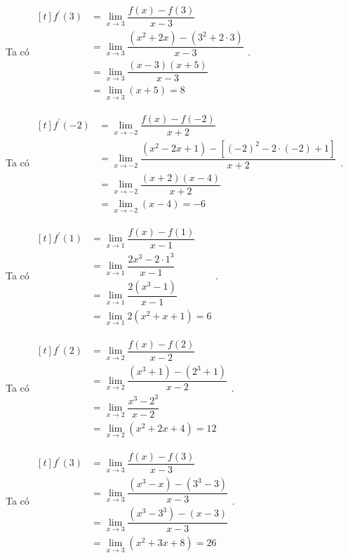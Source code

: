 \begin{vd}
{\begin{listEX}[2]
	Ta có 
	$\begin{aligned}[t]
	f^{\prime}(3)
	&=\lim\limits_{x \to 3}\dfrac{f(x)-f(3)}{x-3}\\
	&=\lim\limits_{x \to 3}\dfrac{(x^2+2x)-(3^2+2\cdot 3)}{x-3}\\
	&=\lim\limits_{x \to 3}\dfrac{(x-3)(x+5)}{x-3}\\
	&=\lim\limits_{x \to 3}(x+5)=8
	\end{aligned}
	$.
	\item 
	Ta có 
	$\begin{aligned}[t]
	f^{\prime}(-2)
	&=\lim\limits_{x \to -2}\dfrac{f(x)-f(-2)}{x+2}\\
	&=\lim\limits_{x \to -2}\dfrac{(x^2-2x+1)-\left[ (-2)^2-2\cdot(-2)+1\right]}{x+2}\\
	&=\lim\limits_{x \to -2}\dfrac{(x+2)(x-4)}{x+2}\\
	&=\lim\limits_{x \to -2}(x-4)=-6
	\end{aligned}
	$.
	\item 
	Ta có 
	$\begin{aligned}[t]
	f^{\prime}(1)
	&=\lim\limits_{x \to 1}\dfrac{f(x)-f(1)}{x-1}\\
	&=\lim\limits_{x \to 1}\dfrac{2x^3-2\cdot 1^3}{x-1}\\
	&=\lim\limits_{x \to 1}\dfrac{2(x^3-1)}{x-1}\\
	&=\lim\limits_{x \to 1}2(x^2+x+1)=6
	\end{aligned}
	$.
	\item 
	Ta có 
	$\begin{aligned}[t]
	f^{\prime}(2)
	&=\lim\limits_{x \to 2}\dfrac{f(x)-f(2)}{x-2}\\
	&=\lim\limits_{x \to 2}\dfrac{(x^3+1)-(2^3+1)}{x-2}\\
	&=\lim\limits_{x \to 2}\dfrac{x^3-2^3}{x-2}\\
	&=\lim\limits_{x \to 2}(x^2+2x+4)=12
	\end{aligned}
	$.
	\item 
	Ta có 
	$\begin{aligned}[t]
	f^{\prime}(3)
	&=\lim\limits_{x \to 3}\dfrac{f(x)-f(3)}{x-3}\\
	&=\lim\limits_{x \to 3}\dfrac{(x^3-x)-(3^3-3)}{x-3}\\
	&=\lim\limits_{x \to 3}\dfrac{(x^3-3^3)-(x-3)}{x-3}\\
	&=\lim\limits_{x \to 3}(x^2+3x+8)=26
	\end{aligned}
	$.
	\end{listEX}
	}
\end{vd}
